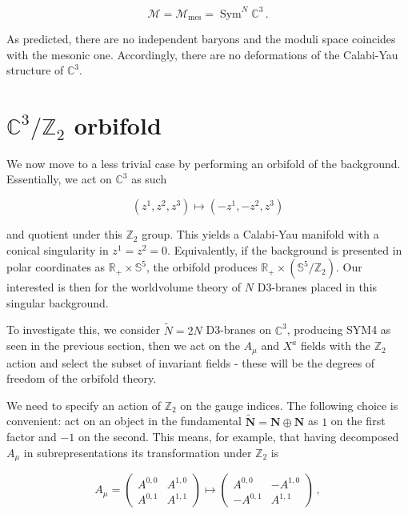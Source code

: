 \begin{equation}
	\mathcal{M} = \mathcal{M}_\text{mes} = \operatorname{Sym}^N \mathbb{C}^3\,.
	\label{}
\end{equation}

As predicted, there are no independent baryons and the moduli space coincides with the mesonic one. Accordingly, there are no deformations of the Calabi-Yau structure of $\mathbb{C}^3$.

\section{$\mathbb{C}^3/\mathbb{Z}_2$ orbifold}

We now move to a less trivial case by performing an orbifold of the background. Essentially, we act on $\mathbb{C}^3$ as such

\begin{equation}
	(z^1, z^2, z^3) \mapsto (-z^1, -z^2, z^3)
	\label{}
\end{equation}

and quotient under this $\mathbb{Z}_2$ group. This yields a Calabi-Yau manifold with a conical singularity in $z^1 = z^2 =0$. Equivalently, if the background is presented in polar coordinates as $\mathbb{R}_+ \times \mathbb{S}^5$, the orbifold produces $\mathbb{R}_+ \times (\mathbb{S}^5 / \mathbb{Z}_2)$. Our interested is then for the worldvolume theory of $N$ D3-branes placed in this singular background.

To investigate this, we consider $\tilde N = 2N$ D3-branes on $\mathbb{C}^3$, producing SYM4 as seen in the previous section, then we act on the $A_\mu$ and $X^a$ fields with the $\mathbb{Z}_2$ action and select the subset of invariant fields - these will be the degrees of freedom of the orbifold theory.

We need to specify an action of $\mathbb{Z}_2$ on the gauge indices. The following choice is convenient: act on an object in the fundamental $\mathbf{\tilde N} = \mathbf{N} \oplus \mathbf{N}$ as $1$ on the first factor and $-1$ on the second. This means, for example, that having decomposed $A_\mu$ in subrepresentations its transformation under $\mathbb{Z}_2$ is

\begin{equation}
	A_\mu = \begin{pmatrix}
		A^{0,0} & A^{1,0} \\
		A^{0,1} & A^{1,1}
	\end{pmatrix} \mapsto \begin{pmatrix}
		A^{0,0} & -A^{1,0} \\
		-A^{0,1} & A^{1,1}
	\end{pmatrix}\,,
\end{equation}

